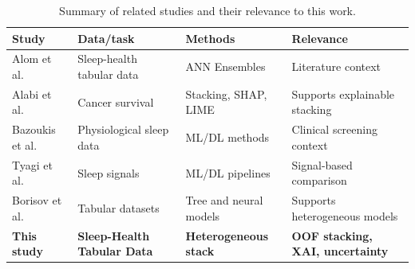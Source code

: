 \documentclass[a4paper,fleqn]{cas-dc}
\begin{document}
\begin{table}[width=\textwidth,pos=!tbp]

\centering

\caption{Summary of related studies and their relevance to this work.}

\label{tab:related_work}

\small

\setlength{\tabcolsep}{4pt}

\renewcommand{\arraystretch}{1.05}

\begin{tabularx}{\textwidth}{@{}Q{0.18\textwidth}Q{0.22\textwidth}Q{0.23\textwidth}Y@{}}

\toprule

Study & Data/task & Methods & Relevance \\

\midrule

Alom et al. \cite{alom2024} &

Sleep-health tabular data &

ANN Ensembles &

Literature context \\

Alabi et al. \cite{alabi2023} &

Cancer survival &

Stacking, SHAP, LIME &

Supports explainable stacking \\

Bazoukis et al. \cite{bazoukis2023} &

Physiological sleep data &

ML/DL methods &

Clinical screening context \\

Tyagi et al. \cite{tyagi2023} &

Sleep signals &

ML/DL pipelines &

Signal-based comparison \\

Borisov et al. \cite{borisov2024} &

Tabular datasets &

Tree and neural models &

Supports heterogeneous models \\

\textbf{This study} &

\textbf{Sleep-Health Tabular Data} &

\textbf{Heterogeneous stack} &

\textbf{OOF stacking, XAI, uncertainty} \\

\bottomrule

\end{tabularx}

\end{table}
\end{document}
